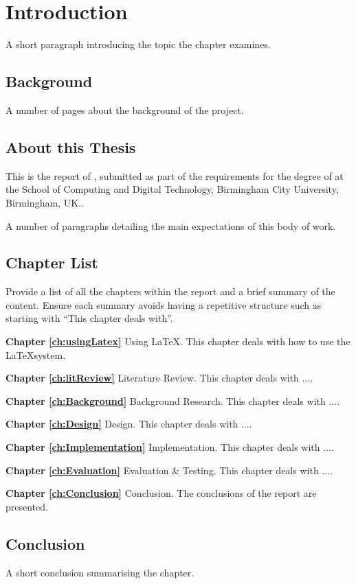 \chapter{Introduction}
 \setcounter{page}{1}

A short paragraph introducing the topic the chapter examines.


\section{Background}

A number of pages about the background of the project.

\section{About this Thesis}
This is the report of \emph{\authorName}, submitted as part of the requirements for the degree of \degreeAward at the School of Computing and Digital Technology, Birmingham City University, Birmingham, UK..

A number of paragraphs detailing the main expectations of this body of work.


\section{Chapter List}
Provide a list of all the chapters within the report and a brief summary of the content. Ensure each summary avoids having a repetitive structure such as starting with ``This chapter deals with''.

\textbf{Chapter \ref{ch:usingLatex}} Using \LaTeX. This chapter
deals with how to use the \LaTeX \space system.

\textbf{Chapter \ref{ch:litReview}} Literature Review. This chapter
deals with $\ldots$.

\textbf{Chapter \ref{ch:Background}} Background Research. This chapter
deals with $\ldots$.

\textbf{Chapter \ref{ch:Design}} Design. This chapter
deals with $\ldots$.

\textbf{Chapter \ref{ch:Implementation}} Implementation. This chapter
deals with $\ldots$.

\textbf{Chapter \ref{ch:Evaluation}} Evaluation \& Testing. This chapter
deals with $\ldots$.

\textbf{Chapter \ref{ch:Conclusion}} Conclusion. The conclusions of the report are presented.


\section{Conclusion}
A short conclusion summarising the chapter.
